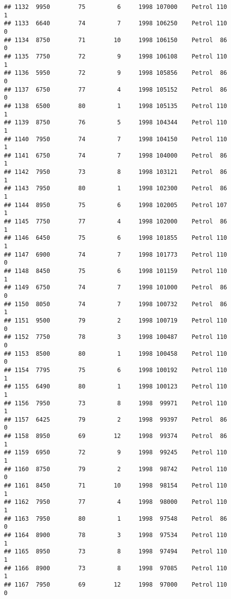 \documentclass[]{article}
\begin{document}
\begin{verbatim}
## 1132  9950        75         6     1998 107000    Petrol 110         1
## 1133  6640        74         7     1998 106250    Petrol 110         0
## 1134  8750        71        10     1998 106150    Petrol  86         0
## 1135  7750        72         9     1998 106108    Petrol 110         1
## 1136  5950        72         9     1998 105856    Petrol  86         0
## 1137  6750        77         4     1998 105152    Petrol  86         0
## 1138  6500        80         1     1998 105135    Petrol 110         1
## 1139  8750        76         5     1998 104344    Petrol 110         1
## 1140  7950        74         7     1998 104150    Petrol 110         1
## 1141  6750        74         7     1998 104000    Petrol  86         1
## 1142  7950        73         8     1998 103121    Petrol  86         1
## 1143  7950        80         1     1998 102300    Petrol  86         1
## 1144  8950        75         6     1998 102005    Petrol 107         1
## 1145  7750        77         4     1998 102000    Petrol  86         1
## 1146  6450        75         6     1998 101855    Petrol 110         1
## 1147  6900        74         7     1998 101773    Petrol 110         0
## 1148  8450        75         6     1998 101159    Petrol 110         1
## 1149  6750        74         7     1998 101000    Petrol  86         0
## 1150  8050        74         7     1998 100732    Petrol  86         1
## 1151  9500        79         2     1998 100719    Petrol 110         0
## 1152  7750        78         3     1998 100487    Petrol 110         0
## 1153  8500        80         1     1998 100458    Petrol 110         0
## 1154  7795        75         6     1998 100192    Petrol 110         1
## 1155  6490        80         1     1998 100123    Petrol 110         1
## 1156  7950        73         8     1998  99971    Petrol 110         1
## 1157  6425        79         2     1998  99397    Petrol  86         0
## 1158  8950        69        12     1998  99374    Petrol  86         1
## 1159  6950        72         9     1998  99245    Petrol 110         1
## 1160  8750        79         2     1998  98742    Petrol 110         0
## 1161  8450        71        10     1998  98154    Petrol 110         1
## 1162  7950        77         4     1998  98000    Petrol 110         1
## 1163  7950        80         1     1998  97548    Petrol  86         0
## 1164  8900        78         3     1998  97534    Petrol 110         1
## 1165  8950        73         8     1998  97494    Petrol 110         1
## 1166  8900        73         8     1998  97085    Petrol 110         1
## 1167  7950        69        12     1998  97000    Petrol 110         0

\end{verbatim}
\end{document}
